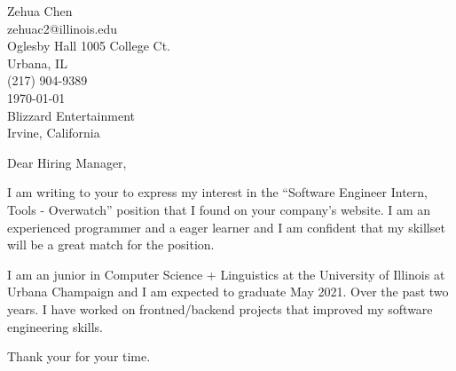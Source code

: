 \documentclass[letterpaper, 11pt]{article}
\begin{document}
  Zehua Chen \\
  zehuac2@illinois.edu \\
  Oglesby Hall 1005 College Ct. \\
  Urbana, IL \\
  (217) 904-9389 \\
  \today \\
  Blizzard Entertainment \\
  Irvine, California

  \vspace{12pt}
  Dear Hiring Manager,

  \vspace{12pt}
  I am writing to your to express my interest in the
  “Software Engineer Intern, Tools - Overwatch” position that
  I found on your company’s website. I am an experienced programmer and
  a eager learner and I am confident that my
  skillset will be a great match for the position.

  I am an junior in Computer Science + Linguistics at the University of Illinois
  at Urbana Champaign and I am expected to graduate May 2021. Over the past
  two years. I have worked on frontned/backend projects that improved my
  software engineering skills.

  Thank your for your time.
\end{document}
